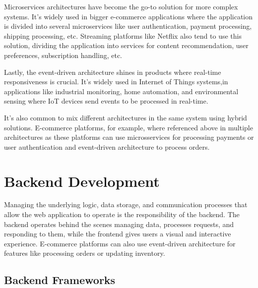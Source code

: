 Microservices architectures have become the go-to solution for more complex
systems. It's widely used in bigger e-commerce applications where the application
is divided into several microservices like user authentication, payment processing,
shipping processing, etc. Streaming platforms like Netflix also tend to use this
solution, dividing the application into services for content recommendation, user
preferences, subscription handling, etc.

Lastly, the event-driven architecture shines in products where real-time
responsiveness is crucial. It's widely used in Internet of Things systems,in
applications like industrial monitoring, home automation, and environmental
sensing where \gls{IoT} devices send events to be processed in real-time.

It's also common to mix different architectures in the same system using
hybrid solutions. E-commerce platforms, for example, where referenced above in
multiple architectures as these platforms can use microsservices for processing
payments or user authentication and event-driven architecture to process orders.

\section{Backend Development}
Managing the underlying logic, data storage, and communication processes that
allow the web application to operate is the responsibility of the backend.
The backend operates behind the scenes managing data, processes requests, and
responding to them, while the frontend gives users a visual and interactive
experience. E-commerce platforms can also use event-driven architecture for
features like processing orders or updating inventory.

\subsection{Backend Frameworks}
